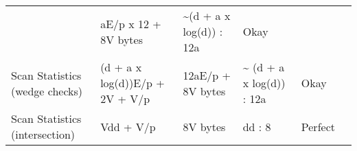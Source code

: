 \documentclass[10pt,oneside]{memoir}
\begin{document}
\begin{longtable}[]{@{}llllll@{}}
\begin{minipage}[t]{0.10\columnwidth}
\end{minipage} & \begin{minipage}[t]{0.13\columnwidth}\raggedright
aE/p x 12 + 8V bytes\strut
\end{minipage} & \begin{minipage}[t]{0.19\columnwidth}\raggedright
\textasciitilde{}(d + a x log(d)) : 12a\strut
\end{minipage} & \begin{minipage}[t]{0.11\columnwidth}\raggedright
Okay\strut
\end{minipage} & \begin{minipage}[t]{0.12\columnwidth}\raggedright
\strut
\end{minipage}\tabularnewline
\begin{minipage}[t]{0.19\columnwidth}\raggedright
Scan Statistics (wedge checks)\strut
\end{minipage} & \begin{minipage}[t]{0.10\columnwidth}\raggedright
(d + a x log(d))E/p + 2V + V/p\strut
\end{minipage} & \begin{minipage}[t]{0.13\columnwidth}\raggedright
12aE/p + 8V bytes\strut
\end{minipage} & \begin{minipage}[t]{0.19\columnwidth}\raggedright
\textasciitilde{} (d + a x log(d)) : 12a\strut
\end{minipage} & \begin{minipage}[t]{0.11\columnwidth}\raggedright
Okay\strut
\end{minipage} & \begin{minipage}[t]{0.12\columnwidth}\raggedright
\strut
\end{minipage}\tabularnewline
\begin{minipage}[t]{0.19\columnwidth}\raggedright
Scan Statistics (intersection)\strut
\end{minipage} & \begin{minipage}[t]{0.10\columnwidth}\raggedright
Vdd + V/p\strut
\end{minipage} & \begin{minipage}[t]{0.13\columnwidth}\raggedright
8V bytes\strut
\end{minipage} & \begin{minipage}[t]{0.19\columnwidth}\raggedright
dd : 8\strut
\end{minipage} & \begin{minipage}[t]{0.11\columnwidth}\raggedright
Perfect\strut
\end{minipage} & \begin{minipage}[t]{0.12\columnwidth}\raggedright
\strut
\end{minipage}\tabularnewline
\bottomrule
\end{longtable}
\end{document}
